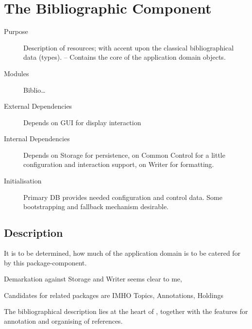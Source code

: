 
\chapter{The Bibliographic Component}
\label{cha:bibco}

\begin{description}
\item[Purpose] Description of resources; with accent upon the
  classical bibliographical data (types). -- Contains the core of the
  application domain objects.
\item[Modules] Biblio\dots
\item[External Dependencies] Depends on GUI for display interaction
\item[Internal Dependencies] Depends on Storage for persistence, on
  Common Control for a little configuration and interaction support,
  on Writer for formatting.
\item[Initialisation] Primary DB provides needed configuration and
  control data. Some bootstrapping and fallback mechanism desirable.
\end{description}



\section{Description}
\label{sec:bibcodesc}

\begin{dnote}
  \item It is to be determined, how much of the application domain is
  to be catered for by this package-component. 
\item Demarkation against Storage and Writer seems clear to me, 
\item Candidates for related packages are IMHO Topics, Annotations,
  Holdings 
\end{dnote}

The bibliographical description lies at the heart of \Pyb, together
with the features for annotation and organising of references.

